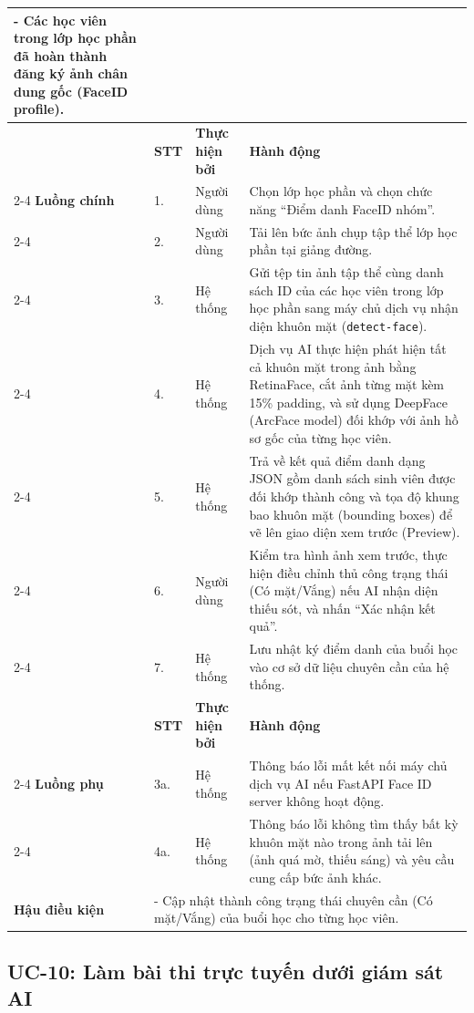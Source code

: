 \documentclass[../DoAn.tex]{subfiles}
\begin{document}
\begin{longtable}{|p{2.8cm}|p{0.8cm}|p{2.2cm}|p{7.5cm}|}
{      - Các học viên trong lớp học phần đã hoàn thành đăng ký ảnh chân dung gốc (FaceID profile).} \\ \hline
     & \textbf{STT} & \textbf{Thực hiện bởi} & \textbf{Hành động} \\ \cline{2-4}
    \textbf{Luồng chính} & 1. & Người dùng & Chọn lớp học phần và chọn chức năng ``Điểm danh FaceID nhóm''. \\ \cline{2-4}
     & 2. & Người dùng & Tải lên bức ảnh chụp tập thể lớp học phần tại giảng đường. \\ \cline{2-4}
     & 3. & Hệ thống & Gửi tệp tin ảnh tập thể cùng danh sách ID của các học viên trong lớp học phần sang máy chủ dịch vụ nhận diện khuôn mặt (\mbox{\texttt{detect-face}}). \\ \cline{2-4}
     & 4. & Hệ thống & Dịch vụ AI thực hiện phát hiện tất cả khuôn mặt trong ảnh bằng RetinaFace, cắt ảnh từng mặt kèm 15\% padding, và sử dụng DeepFace (ArcFace model) đối khớp với ảnh hồ sơ gốc của từng học viên. \\ \cline{2-4}
     & 5. & Hệ thống & Trả về kết quả điểm danh dạng JSON gồm danh sách sinh viên được đối khớp thành công và tọa độ khung bao khuôn mặt (bounding boxes) để vẽ lên giao diện xem trước (Preview). \\ \cline{2-4}
     & 6. & Người dùng & Kiểm tra hình ảnh xem trước, thực hiện điều chỉnh thủ công trạng thái (Có mặt/Vắng) nếu AI nhận diện thiếu sót, và nhấn ``Xác nhận kết quả''. \\ \cline{2-4}
     & 7. & Hệ thống & Lưu nhật ký điểm danh của buổi học vào cơ sở dữ liệu chuyên cần của hệ thống. \\ \hline
     & \textbf{STT} & \textbf{Thực hiện bởi} & \textbf{Hành động} \\ \cline{2-4}
    \textbf{Luồng phụ} & 3a. & Hệ thống & Thông báo lỗi mất kết nối máy chủ dịch vụ AI nếu FastAPI Face ID server không hoạt động. \\ \cline{2-4}
     & 4a. & Hệ thống & Thông báo lỗi không tìm thấy bất kỳ khuôn mặt nào trong ảnh tải lên (ảnh quá mờ, thiếu sáng) và yêu cầu cung cấp bức ảnh khác. \\ \hline
    \textbf{Hậu điều kiện} & \multicolumn{3}{p{10.9cm}|}{- Cập nhật thành công trạng thái chuyên cần (Có mặt/Vắng) của buổi học cho từng học viên.} \\ \hline
\end{longtable}

\subsection{UC-10: Làm bài thi trực tuyến dưới giám sát AI}
\end{document}
